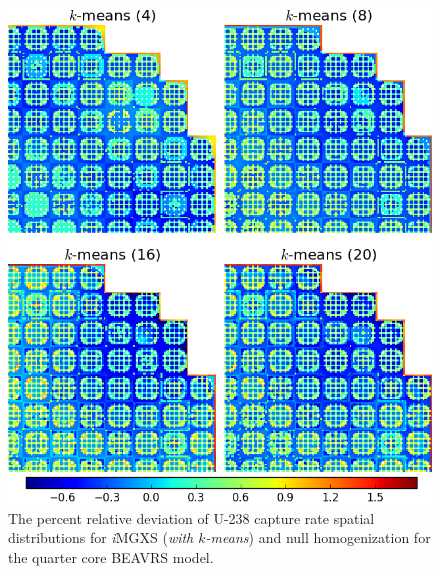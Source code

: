 \begin{figure}[h!]
\centering
\includegraphics[width=0.9\linewidth]{figures/results/compare/full-core/compare-capt-kmeans}
\vspace{2mm}
\caption[U-238 capture rate \textit{i}MGXS-to-null relative deviations]{The percent relative deviation of U-238 capture rate spatial distributions for \textit{i}\ac{MGXS} (\textit{with $k$-means}) and null homogenization for the quarter core BEAVRS model.}
\label{fig:chap11-full-core-capt-rates-kmeans-comp}
\end{figure}

\clearpage

